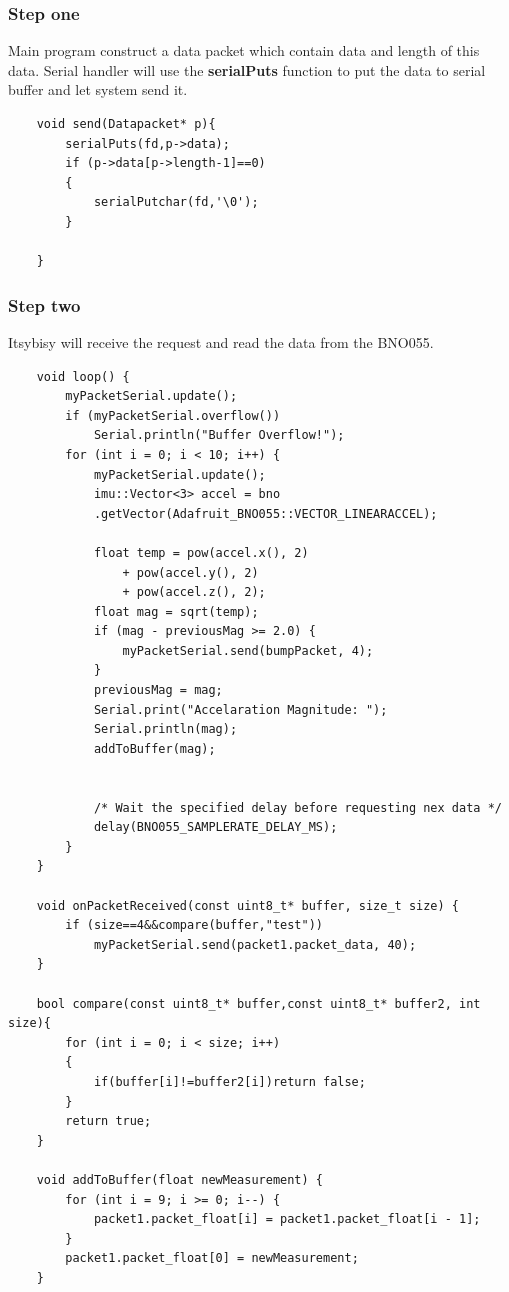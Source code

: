 \documentclass{article}
\begin{document}
	\subsubsection{Step one}
	Main program construct a data packet which contain data and length of this data. Serial handler will use the \textbf{serialPuts} function to put the data to serial buffer and let system send it.
	\begin{lstlisting}
	void send(Datapacket* p){
		serialPuts(fd,p->data);
		if (p->data[p->length-1]==0)
		{
			serialPutchar(fd,'\0');
		}
	
	}
	\end{lstlisting}
	\subsubsection{Step two}
	Itsybisy will receive the request and read the data from the BNO055.
	\begin{lstlisting}
	void loop() {
		myPacketSerial.update();
		if (myPacketSerial.overflow())
			Serial.println("Buffer Overflow!");
		for (int i = 0; i < 10; i++) {
			myPacketSerial.update();
			imu::Vector<3> accel = bno
			.getVector(Adafruit_BNO055::VECTOR_LINEARACCEL);
			
			float temp = pow(accel.x(), 2) 
				+ pow(accel.y(), 2) 
				+ pow(accel.z(), 2);
			float mag = sqrt(temp);
			if (mag - previousMag >= 2.0) {
				myPacketSerial.send(bumpPacket, 4);
			}
			previousMag = mag;
			Serial.print("Accelaration Magnitude: ");
			Serial.println(mag);
			addToBuffer(mag);
			
			
			/* Wait the specified delay before requesting nex data */
			delay(BNO055_SAMPLERATE_DELAY_MS);
		}
	}
	
	void onPacketReceived(const uint8_t* buffer, size_t size) {
		if (size==4&&compare(buffer,"test"))
			myPacketSerial.send(packet1.packet_data, 40);
	}
	
	bool compare(const uint8_t* buffer,const uint8_t* buffer2, int size){
		for (int i = 0; i < size; i++)
		{
			if(buffer[i]!=buffer2[i])return false;
		}
		return true;
	}
	
	void addToBuffer(float newMeasurement) {
		for (int i = 9; i >= 0; i--) {
			packet1.packet_float[i] = packet1.packet_float[i - 1];
		}
		packet1.packet_float[0] = newMeasurement;
	}
	\end{lstlisting}
\end{document}
